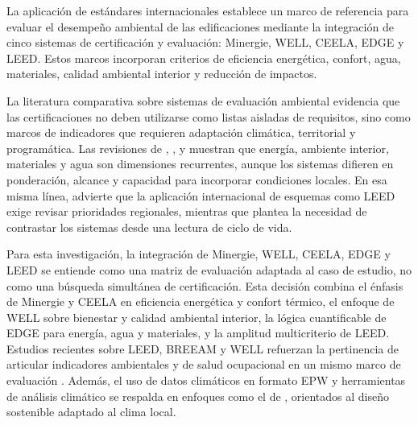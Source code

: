 \begin{textoDosTercios}

La aplicación de estándares internacionales establece un marco de referencia para evaluar el desempeño ambiental de las edificaciones mediante la integración de cinco sistemas de certificación y evaluación: Minergie, WELL, CEELA, EDGE y LEED. Estos marcos incorporan criterios de eficiencia energética, confort, agua, materiales, calidad ambiental interior y reducción de impactos.

La literatura comparativa sobre sistemas de evaluación ambiental evidencia que las certificaciones no deben utilizarse como listas aisladas de requisitos, sino como marcos de indicadores que requieren adaptación climática, territorial y programática. Las revisiones de \textcite{doanCriticalComparisonGreen2017}, \textcite{shanGreenBuildingRating2018}, \textcite{marchiGreenBuildingRating2021} y \textcite{ascioneBuildingRatingSystems2022} muestran que energía, ambiente interior, materiales y agua son dimensiones recurrentes, aunque los sistemas difieren en ponderación, alcance y capacidad para incorporar condiciones locales. En esa misma línea, \textcite{suzerComparativeReviewEnvironmental2015} advierte que la aplicación internacional de esquemas como LEED exige revisar prioridades regionales, mientras que \textcite{huSustainableDesignRating2017} plantea la necesidad de contrastar los sistemas desde una lectura de ciclo de vida.

Para esta investigación, la integración de Minergie, WELL, CEELA, EDGE y LEED se entiende como una matriz de evaluación adaptada al caso de estudio, no como una búsqueda simultánea de certificación. Esta decisión combina el énfasis de Minergie y CEELA en eficiencia energética y confort térmico, el enfoque de WELL sobre bienestar y calidad ambiental interior, la lógica cuantificable de EDGE para energía, agua y materiales, y la amplitud multicriterio de LEED. Estudios recientes sobre LEED, BREEAM y WELL refuerzan la pertinencia de articular indicadores ambientales y de salud ocupacional en un mismo marco de evaluación \parencite{tsirovasilisComparativeAssessmentLEED2025,kentIndoorEnvironmentalQuality2024}. Además, el uso de datos climáticos en formato EPW y herramientas de análisis climático se respalda en enfoques como el de \textcite{bettiCBEClimaTool2024}, orientados al diseño sostenible adaptado al clima local.

\end{textoDosTercios}

